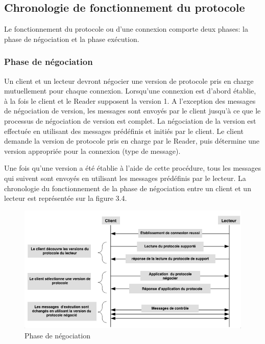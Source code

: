 \documentclass[11pt, a4paper, twoside]{book}
\begin{document}
\subsection{Chronologie de fonctionnement du protocole}
Le fonctionnement du protocole ou d'une connexion comporte deux phases: la phase de négociation et la phase exécution.
\subsubsection{Phase de négociation}
Un client et un lecteur devront négocier une version de protocole pris en charge mutuellement pour chaque connexion. Lorsqu'une connexion  est d'abord établie, à la fois le client et le Reader supposent la version 1. A l'exception des messages de négociation de version, les messages sont envoyés par le client  jusqu'à ce que le processus de négociation de version est complet. La négociation de la version est effectuée en utilisant des messages prédéfinis et initiés par le client. Le client demande la version de protocole pris en charge par le Reader, puis détermine une version appropriée pour la connexion (type de message).
 
Une fois qu'une version a été établie à l'aide de cette procédure, tous les messages qui suivent sont envoyés en utilisant les messages prédéfinis par le lecteur. La chronologie du fonctionnement de la phase de négociation  entre un client et un lecteur est représentée sur la figure 3.4.
\begin{figure}[!h]
\centering
\includegraphics[width=\textwidth]{negotiation2}
\caption{Phase de négociation}
\end{figure}
\end{document}
